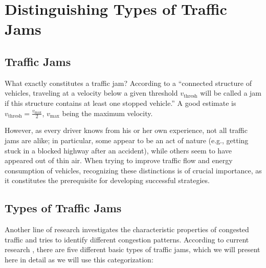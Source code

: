 \documentclass{acmrip}
\begin{document}
\iffalse
\begin{figure}[tp]
\centering \epsfig{file=screenshot0000.eps,
width=6cm}\\\vspace*{1cm} \epsfig{file=screenshot0001.eps,
width=6cm}
\ \\
\vspace*{1cm} \epsfig{file=screenshot0002.eps, width = 6cm}
\caption{\label{isola}\small Screenshots from the simulation of HDCs
for recognizing a traffic jam. Top: the front of the traffic jam.
Center: overview with front and end. Bottom: the end of the traffic
jam. }
\end{figure}
\fi




\section{Distinguishing Types of Traffic Jams}

\subsection{Traffic Jams}
What exactly constitutes a traffic jam?
    According to \cite{k-mmtfi-97} a
    ``connected structure of vehicles, traveling at a velocity below a
    given threshold $v_{\mathrm{thresh}}$ will be called a jam if this
    structure contains at least one stopped vehicle.'' A good
estimate is $v_{\mathrm{thresh}} = \frac{v_{\mathrm{max}}}{2}$,
${v_{\mathrm{max}}}$ being the maximum velocity.

However, as every driver knows from his or her own experience, not
all traffic jams are alike; in particular, some appear to be an act
of nature (e.g., getting stuck in a blocked highway after an
accident), while others seem to have appeared out of thin air. When
trying to improve traffic flow and energy consumption of vehicles,
recognizing these distinctions is of crucial importance, as it
constitutes the prerequisite for developing successful strategies.

\subsection{Types of Traffic Jams}\label{subsec:types}
Another line of research investigates the characteristic properties
of congested traffic and tries to identify different congestion
patterns. According to current research \cite{sh-efctstitm-07},
there are five different basic types of traffic jams, which we will
present here in detail as we will use this categorization:
\end{document}
